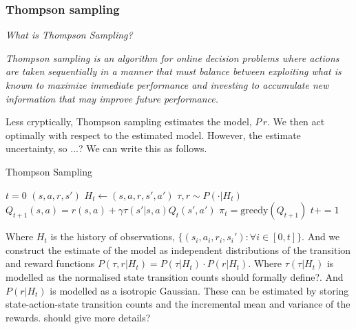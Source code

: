 
\subsubsection{Thompson sampling} \label{ts}
\begin{displayquote}
	\textsl{What is Thompson Sampling?}
\end{displayquote}

\begin{displayquote}
	\textit{Thompson sampling is an algorithm for online decision problems where actions are taken sequentially in a manner that
must balance between exploiting what is known to maximize immediate performance and investing to accumulate
new information that may improve future performance.}\cite{Russo2017}
\end{displayquote}

Less cryptically, Thompson sampling estimates the model, $P\, r$. We then act optimally with respect to the estimated model. However, the estimate uncertainty, so ...? We can write this as follows.

\begin{algorithm}
	\caption{Thompson Sampling}
	\begin{algorithmic}[1]

		\State $t=0$
		\State $(s, a, r, s')$ 
		\State $H_t \leftarrow (s, a, r, s', a')$ 
		\State $\tau, r \sim P(\cdot | H_t)$ 
		\State $Q_{t+1}(s, a) = r(s, a) + \gamma \tau(s'| s, a) Q_t(s', a')$ 
		\State $\pi_t = \text{greedy}(Q_{t+1})$ 
		\State $t += 1$

		\EndWhile
		\State {}
		\EndProcedure

	\end{algorithmic}
\end{algorithm}

Where $H_t$ is the history of observations, $\{(s_i, a_i, r_i, s_i') : \forall i \in [0, t]\}$.
And we construct the estimate of the model as independent distributions of the transition and reward functions $P(\tau, r | H_t) = P(\tau | H_t) \cdot P(r | H_t)$. Where $\tau(\tau | H_t)$
is modelled as the normalised state transition counts {\color{red}should formally define?}.
And $P(r | H_t)$ is modelled as a isotropic Gaussian.
These can be estimated by storing state-action-state transition counts
and the incremental mean and variance of the rewards. {\color{red}should give more details?}

